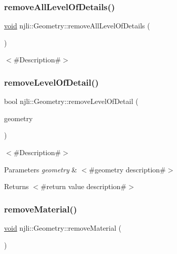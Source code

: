 \subsubsection{\texorpdfstring{remove\+All\+Level\+Of\+Details()}{removeAllLevelOfDetails()}}
{\footnotesize\ttfamily \mbox{\hyperlink{_thread_8h_af1e856da2e658414cb2456cb6f7ebc66}{void}} njli\+::\+Geometry\+::remove\+All\+Level\+Of\+Details (\begin{DoxyParamCaption}{ }\end{DoxyParamCaption})}

$<$\#\+Description\#$>$ \mbox{\label{classnjli_1_1_geometry_ae0001216bacc787a9c235fb78609d276}} 
\subsubsection{\texorpdfstring{remove\+Level\+Of\+Detail()}{removeLevelOfDetail()}}
{\footnotesize\ttfamily bool njli\+::\+Geometry\+::remove\+Level\+Of\+Detail (\begin{DoxyParamCaption}\item[{\mbox{\hyperlink{classnjli_1_1_level_of_detail}{Level\+Of\+Detail}} $\ast$}]{geometry }\end{DoxyParamCaption})}

$<$\#\+Description\#$>$


\begin{DoxyParams}{Parameters}
{\em geometry} & $<$\#geometry description\#$>$\\
\hline
\end{DoxyParams}
\begin{DoxyReturn}{Returns}
$<$\#return value description\#$>$ 
\end{DoxyReturn}
\mbox{\label{classnjli_1_1_geometry_a419d020ca0b46536bb53d923fd1c7df3}} 
\subsubsection{\texorpdfstring{remove\+Material()}{removeMaterial()}}
{\footnotesize\ttfamily \mbox{\hyperlink{_thread_8h_af1e856da2e658414cb2456cb6f7ebc66}{void}} njli\+::\+Geometry\+::remove\+Material (\begin{DoxyParamCaption}{ }\end{DoxyParamCaption})}


